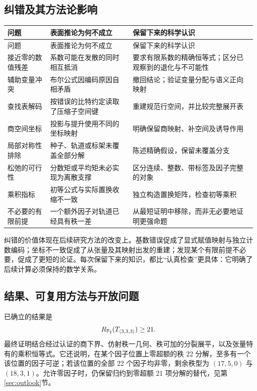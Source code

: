 \subsection{纠错及其方法论影响}\label{route:corrections}

\begin{longtable}{@{}L{3.3cm}L{5.1cm}L{5.8cm}@{}}
\toprule
问题&表面推论为何不成立&保留下来的科学认识\\
\midrule
\endfirsthead
\toprule 问题&表面推论为何不成立&保留下来的科学认识\\\midrule
\endhead
\bottomrule\endfoot
接近零的数值残差&系数可能在发散的同时相互抵消&要求有限系数的精确恒等式；区分已观察到的退化与不可能性\\
辅助变量冲突&布尔公式因编码原因自相矛盾&撤回结论；验证变量分配与语义正向映射\\
查找表解码&按错误的比特约定读取了压缩子空间键&重建规范行空间，并比较完整展开表\\
商空间坐标&投影与提升使用不同的坐标映射&明确保留商映射、补空间及诱导作用\\
局部对称性排除&种子、轨道或标架未覆盖全部分解&陈述精确假设，保留未覆盖分支\\
松弛的可行性&分数矩或平均矩未必实现为离散支撑&区分连续、整数、带标签及因子完整的对象\\
乘积指标&初等公式与实际置换收缩不一致&独立构造置换矩阵，检查初等乘积\\
不必要的有限前提&一个额外因子对轨道已经具有秩一差&从最短证明中移除，而非无必要地证明更强命题\\
\end{longtable}

纠错的价值体现在后续研究方法的改变上。基数错误促成了显式赋值映射与独立计数编码；坐标不一致促成了从张量及其映射出发的重建；发现某个有限前提不必要，促成了更短的论证。每次保留下来的知识，都比“认真检查”更具体：它明确了后续计算必须保持的数学关系。

\subsection{结果、可复用方法与开放问题}\label{route:outcome}

已确立的结果是
\[
 R_{\mathbb{F}_2}(T_{\langle3,3,3\rangle})\ge21.
\]
最终证明结合经过认证的商下界、仿射秩一几何、秩可加的分裂展平，以及张量特有的乘积恒等式。它还说明，在某个因子位置上零超额的秩 22 分解，至多有一个该位置的因子可逆；若该位置的全部 22 个因子均非零，剩余秩型为 $(17,5,0)$ 与 $(18,3,1)$。允许零因子时，仍保留归约到零超额 21 项分解的替代，见第\ref{sec:outlook}节。

